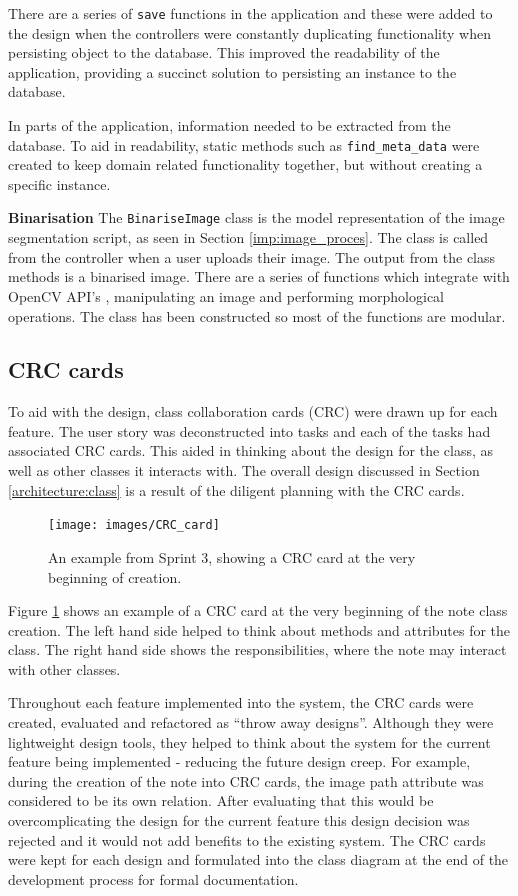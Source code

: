 There are a series of \texttt{save} functions in the application and these were added to the design when the controllers were constantly duplicating functionality when persisting object to the database. This improved the readability of the application, providing a succinct solution to persisting an instance to the database.

In parts of the application, information needed to be extracted from the database. To aid in readability, static methods such as \texttt{find\_meta\_data} were created to keep domain related functionality together, but without creating a specific instance.

\noindent
\textbf{Binarisation}
\newline
The \texttt{BinariseImage} class is the model representation of the image segmentation script, as seen in Section \ref{imp:image_proces}. The class is called from the controller when a user uploads their image. The output from the class methods is a binarised image. There are a series of functions which integrate with OpenCV API's \cite{citeulike:13206865}, manipulating an image and performing morphological operations. The class has been constructed so most of the functions are modular.

\subsection{CRC cards} \label{design:CRC}
To aid with the design, class collaboration cards (CRC) were drawn up for each feature. The user story was deconstructed into tasks and each of the tasks had associated CRC cards. This aided in thinking about the design for the class, as well as other classes it interacts with.  The overall design discussed in Section \ref{architecture:class} is a result of the diligent planning with the CRC cards.

\begin{figure}[H]
  \centering
  \texttt{[image: images/CRC\_card]}
  \caption{An example from Sprint 3, showing a CRC card at the very beginning of creation.}
  \label{fig:crc1}
\end{figure}

Figure \ref{fig:crc1} shows an example of a CRC card at the very beginning of the note class creation. The left hand side helped to think about methods and attributes for the class. The right hand side shows the responsibilities, where the note may interact with other classes.

Throughout each feature implemented into the system, the CRC cards were created, evaluated and refactored as ``throw away designs''. Although they were lightweight design tools, they helped to think about the system for the current feature being implemented - reducing the future design creep. For example, during the creation of the note into CRC cards, the image path attribute was considered to be its own relation. After evaluating that this would be overcomplicating the design for the current feature this design decision was rejected and it would not add benefits to the existing system. The CRC cards were kept for each design and formulated into the class diagram at the end of the development process for formal documentation.

